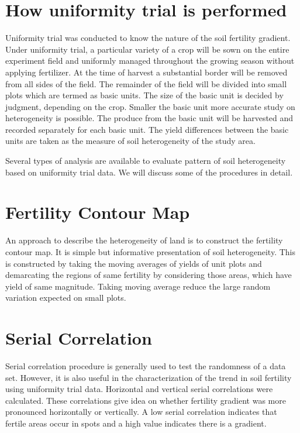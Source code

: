 \documentclass[
]{book}
\begin{document}
\hypertarget{how-uniformity-trial-is-performed}{%
\section{How uniformity trial is performed}\label{how-uniformity-trial-is-performed}}

Uniformity trial was conducted to know the nature of the soil fertility
gradient. Under uniformity trial, a particular variety of a crop will be
sown on the entire experiment field and uniformly managed throughout the
growing season without applying fertilizer. At the time of harvest a
substantial border will be removed from all sides of the field. The
remainder of the field will be divided into small plots which are termed
as basic units. The size of the basic unit is decided by judgment,
depending on the crop. Smaller the basic unit more accurate study on
heterogeneity is possible. The produce from the basic unit will be
harvested and recorded separately for each basic unit. The yield
differences between the basic units are taken as the measure of soil
heterogeneity of the study area.

Several types of analysis are available to evaluate pattern of soil
heterogeneity based on uniformity trial data. We will discuss some of
the procedures in detail.

\hypertarget{fertility-contour-map}{%
\section{Fertility Contour Map}\label{fertility-contour-map}}

An approach to describe the heterogeneity of land is to construct the
fertility contour map. It is simple but informative presentation of soil
heterogeneity. This is constructed by taking the moving averages of
yields of unit plots and demarcating the regions of same fertility by
considering those areas, which have yield of same magnitude. Taking
moving average reduce the large random variation expected on small
plots.

\hypertarget{serial-correlation}{%
\section{Serial Correlation}\label{serial-correlation}}

Serial correlation procedure is generally used to test the randomness of
a data set. However, it is also useful in the characterization of the
trend in soil fertility using uniformity trial data. Horizontal and
vertical serial correlations were calculated. These correlations give
idea on whether fertility gradient was more pronounced horizontally or
vertically. A low serial correlation indicates that fertile areas occur
in spots and a high value indicates there is a gradient.
\end{document}

